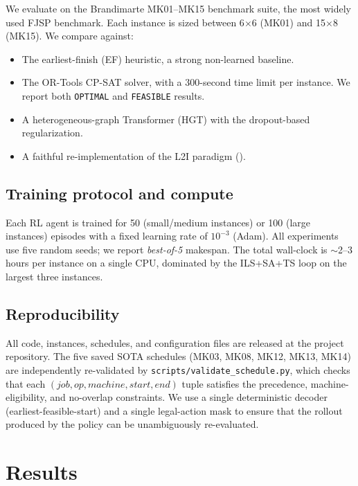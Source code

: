 \documentclass[preprint,review,3p,times,twocolumn]{elsarticle}
\begin{document}
We evaluate on the Brandimarte MK01--MK15 benchmark suite,
the most widely used FJSP benchmark. Each instance is
sized between 6$\times$6 (MK01) and 15$\times$8 (MK15).
We compare against:
\begin{itemize}
  \item The earliest-finish (EF) heuristic, a strong
        non-learned baseline.
  \item The OR-Tools CP-SAT solver, with a 300-second time
        limit per instance. We report both \texttt{OPTIMAL}
        and \texttt{FEASIBLE} results.
  \item A heterogeneous-graph Transformer (HGT) with the
        dropout-based regularization.
  \item A faithful re-implementation of the L2I paradigm
        (\citet{Zhang2024L2I, ICLR 2024}).
\end{itemize}

\subsection{Training protocol and compute}

Each RL agent is trained for 50 (small/medium instances)
or 100 (large instances) episodes with a fixed learning
rate of $10^{-3}$ (Adam). All experiments use five random
seeds; we report \emph{best-of-5} makespan. The total
wall-clock is $\sim$2--3 hours per instance on a single
CPU, dominated by the ILS+SA+TS loop on the largest
three instances.

\subsection{Reproducibility}

All code, instances, schedules, and configuration files
are released at the project repository. The five saved
SOTA schedules (MK03, MK08, MK12, MK13, MK14) are
independently re-validated by
\texttt{scripts/validate\_schedule.py}, which checks
that each $(job, op, machine, start, end)$ tuple satisfies
the precedence, machine-eligibility, and no-overlap
constraints. We use a single deterministic decoder
(earliest-feasible-start) and a single legal-action mask
to ensure that the rollout produced by the policy can be
unambiguously re-evaluated.

\section{Results}
\label{sec:results}
\end{document}

